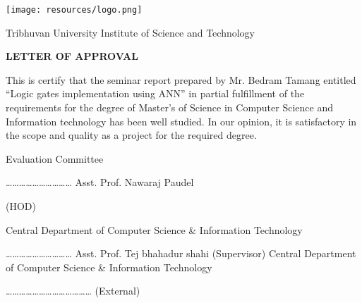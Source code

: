
\begin{center}
	\texttt{[image: resources/logo.png]}
\end{center}

\begin{center}
	Tribhuvan University
	\linebreak
	Institute of Science and Technology 
\end{center}


\begin{center}
	\vspace{2cm}
	\textbf{
		LETTER OF APPROVAL
	}
\end{center}



\vspace{2cm}
This is certify that the seminar report prepared by Mr. Bedram Tamang entitled “Logic gates implementation using ANN” in partial fulfillment of the requirements for the degree of Master's of Science in Computer Science and Information technology has been well studied. In our opinion, it is satisfactory in the scope and quality as a project for the required degree. 


\begin{center}
	Evaluation Committee
\end{center}

\begin{multicols}{2}
	\begin{flushleft}
		…………………………  \newline        
		Asst. Prof. Nawaraj Paudel
	\end{flushleft}
	(HOD)
	\begin{flushleft}	
		Central Department of Computer\newline
		Science \& Information Technology
	\end{flushleft}	
	\columnbreak
	\begin{flushleft}
		………………………… \newline
		Asst. Prof. Tej bhahadur shahi	
		(Supervisor) \newline	
		Central Department of Computer \newline           
		Science \& Information Technology        
	\end{flushleft}
\end{multicols}


\vspace{1cm}
\begin{flushleft}
	…………………………………\newline
	(External)
\end{flushleft}
\clearpage
